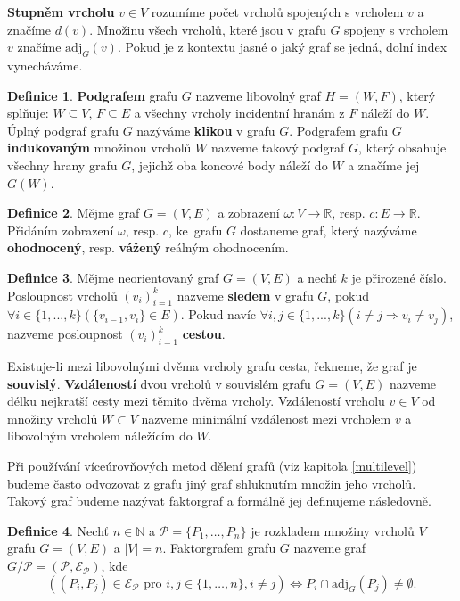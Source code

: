 \documentclass[11pt,american,czech,oneside]{book}
\theoremstyle{plain}
\theoremstyle{definition}
\newtheorem{definition}{Definice}
\begin{document}
\textbf{Stupněm vrcholu} $v \in V$ rozumíme počet vrcholů spojených s vrcholem $v$ a značíme $d(v)$. Množinu všech vrcholů, které jsou v grafu $G$ spojeny s vrcholem $v$ značíme $\mathrm{adj}_G(v)$. Pokud je z kontextu jasné o jaký graf se jedná, dolní index vynecháváme.

\begin{definition}
  \textbf{Podgrafem} grafu $G$ nazveme libovolný graf $H=(W,F)$, který splňuje: $W\subseteq V$, $F\subseteq E$ a všechny vrcholy incidentní hranám z $F$ náleží do $W$. Úplný podgraf grafu $G$ nazýváme \textbf{klikou} v grafu $G$. Podgrafem grafu $G$ \textbf{indukovaným} množinou vrcholů $W$ nazveme takový podgraf $G$, který obsahuje všechny hrany grafu $G$, jejichž oba koncové body náleží do $W$ a značíme jej $G(W)$.
\end{definition}

\begin{definition}
  Mějme graf $G=(V,E)$ a zobrazení $\omega:V \rightarrow \mathbb{R}$, resp. $c: E \rightarrow \mathbb{R}$. Přidáním zobrazení $\omega$, resp. $c$, ke~grafu $G$ dostaneme graf, který nazýváme \textbf{ohodnocený}, resp. \textbf{vážený} reálným ohodnocením.
\end{definition}

\begin{definition}
  Mějme neorientovaný graf $G=(V,E)$ a nechť $k$ je přirozené číslo. Posloupnost vrcholů $(v_i)_{i=1}^{k}$ nazveme \textbf{sledem} v grafu $G$, pokud $\forall i \in \{1,...,k\} (\{v_{i-1},v_i\} \in E)$. Pokud navíc  $\forall i,j \in \{1,...,k\} (i \neq j \Rightarrow v_i \neq v_j)$, nazveme posloupnost $(v_i)_{i=1}^{k}$ \textbf{cestou}.
\end{definition}

Existuje-li mezi libovolnými dvěma vrcholy grafu cesta, řekneme, že graf je \textbf{souvislý}.
\textbf{Vzdáleností} dvou vrcholů v souvislém grafu $G=(V,E)$ nazveme délku nejkratší cesty mezi těmito dvěma vrcholy. Vzdáleností vrcholu $v \in V$ od množiny vrcholů $W \subset V$ nazveme minimální vzdálenost mezi vrcholem $v$ a libovolným vrcholem náležícím do $W$. 

\medskip

Při používání víceúrovňových metod dělení grafů (viz kapitola \ref{multilevel}) budeme často odvozovat z grafu jiný graf shluknutím množin jeho vrcholů. Takový graf budeme nazývat faktorgraf a formálně jej definujeme následovně.

\begin{definition}
  Nechť $n\in \mathbb{N}$ a $\mathcal{P} = \{P_1,\ldots,P_n\}$ je rozkladem množiny vrcholů $V$ grafu $G = (V, E)$ a $|V|=n$. Faktorgrafem grafu $G$ nazveme graf $G / \mathcal{P} = (\mathcal{P}, \mathcal{E_P})$, kde 
  \[
    \left(
      (P_i, P_j)\in \mathcal{E_P} \mbox{ pro } i,j \in \{1,\ldots,n\}, i \neq j 
    \right)
    \Leftrightarrow {P_i \cap \mathrm{adj}_G(P_j) \neq \emptyset}
    .
  \]
\end{definition}
\end{document}

